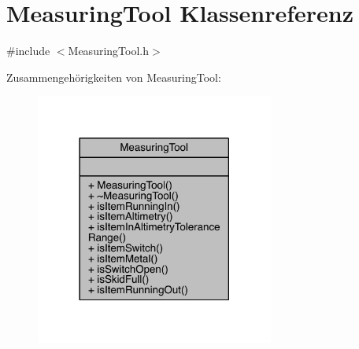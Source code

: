 \hypertarget{class_measuring_tool}{}\section{Measuring\+Tool Klassenreferenz}
\label{class_measuring_tool}


{\ttfamily \#include $<$Measuring\+Tool.\+h$>$}



Zusammengehörigkeiten von Measuring\+Tool\+:
\nopagebreak
\begin{figure}[H]
\begin{center}
\leavevmode
\includegraphics[width=222pt]{class_measuring_tool__coll__graph}
\end{center}
\end{figure}
